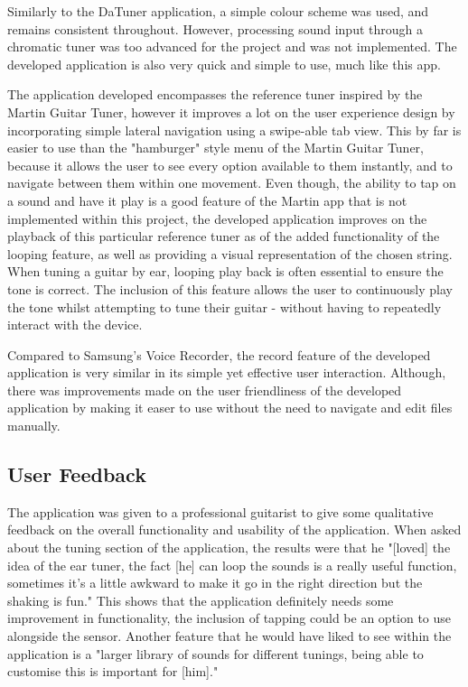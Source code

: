 \documentclass[conference]{acmsiggraph}
\begin{document}
Similarly to the DaTuner application, a simple colour scheme was used, and remains consistent throughout. However, processing sound input through a chromatic tuner was too advanced for the project and was not implemented. The developed application is also very quick and simple to use, much like this app.

The application developed encompasses the reference tuner inspired by the Martin Guitar Tuner, however it improves a lot on the user experience design by incorporating simple lateral navigation using a swipe-able tab view. This by far is easier to use than the "hamburger" style menu of the Martin Guitar Tuner, because it allows the user to see every option available to them instantly, and to navigate between them within one movement. Even though, the ability to tap on a sound and have it play is a good feature of the Martin app that is not implemented within this project, the developed application improves on the playback of this particular reference tuner as of the added functionality of the looping feature, as well as providing a visual representation of the chosen string. When tuning a guitar by ear, looping play back is often essential to ensure the tone is correct. The inclusion of this feature allows the user to continuously play the tone whilst attempting to tune their guitar - without having to repeatedly interact with the device.

Compared to Samsung's Voice Recorder, the record feature of the developed application is very similar in its simple yet effective user interaction. Although, there was improvements made on the user friendliness of the developed application by making it easer to use without the need to navigate and edit files manually.

\subsection{User Feedback}

The application was given to a professional guitarist to give some qualitative feedback on the overall functionality and usability of the application. When asked about the tuning section of the application, the results were that he "[loved] the idea of the ear tuner, the fact [he] can loop the sounds is a really useful function, sometimes it's a little awkward to make it go in the right direction but the shaking is fun." This shows that the application definitely needs some improvement in functionality, the inclusion of tapping could be an option to use alongside the sensor. Another feature that he would have liked to see within the application is a "larger library of sounds for different tunings, being able to customise this is important for [him]."
\end{document}

